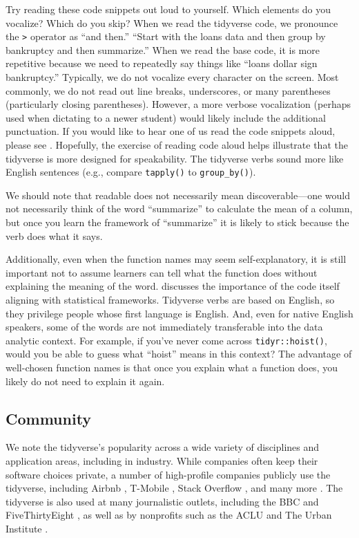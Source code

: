 \documentclass[12pt]{article}
\begin{document}
Try reading these code snippets out loud to yourself. Which elements do
you vocalize? Which do you skip? When we read the tidyverse code, we
pronounce the \texttt{\textbar{}\textgreater{}} operator as ``and
then.'' ``Start with the loans data and then group by bankruptcy and
then summarize.'' When we read the base code, it is more repetitive
because we need to repeatedly say things like ``loans dollar sign
bankruptcy.'' Typically, we do not vocalize every character on the
screen. Most commonly, we do not read out line breaks, underscores, or
many parentheses (particularly closing parentheses). However, a more
verbose vocalization (perhaps used when dictating to a newer student)
would likely include the additional punctuation. If you would like to
hear one of us read the code snippets aloud, please see
\citet{mcnamara2021}. Hopefully, the exercise of reading code aloud
helps illustrate that the tidyverse is more designed for speakability.
The tidyverse verbs sound more like English sentences (e.g., compare
\texttt{tapply()} to \texttt{group\_by()}).

We should note that readable does not necessarily mean
discoverable---one would not necessarily think of the word ``summarize''
to calculate the mean of a column, but once you learn the framework of
``summarize'' it is likely to stick because the verb does what it says.

Additionally, even when the function names may seem self-explanatory, it
is still important not to assume learners can tell what the function
does without explaining the meaning of the word. \citet{thoma2021}
discusses the importance of the code itself aligning with statistical
frameworks. Tidyverse verbs are based on English, so they privilege
people whose first language is English. And, even for native English
speakers, some of the words are not immediately transferable into the
data analytic context. For example, if you've never come across
\texttt{tidyr::hoist()}, would you be able to guess what ``hoist'' means
in this context? The advantage of well-chosen function names is that
once you explain what a function does, you likely do not need to explain
it again.

\hypertarget{sec:community}{%
\subsection{Community}\label{sec:community}}

We note the tidyverse's popularity across a wide variety of disciplines
and application areas, including in industry. While companies often keep
their software choices private, a number of high-profile companies
publicly use the tidyverse, including Airbnb \citep{bion_how_2018},
T-Mobile \citep{nolis_were_2020}, Stack Overflow
\citep{robinson_exploring_2015}, and many more
\citep{rstudio_pbc_rstudio_nodate}. The tidyverse is also used at many
journalistic outlets, including the BBC
\citep{bbc_visual_and_data_journalism_how_2019} and FiveThirtyEight
\citep{flowers_fivethirtyeights_2016}, as well as by nonprofits such as
the ACLU \citep{watson_r_2019} and The Urban Institute
\citep{dataurban_building_2019}.
\end{document}

